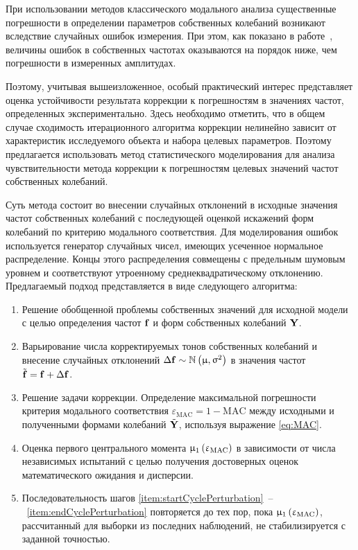 При использовании методов классического модального анализа существенные погрешности в определении параметров собственных колебаний возникают вследствие случайных ошибок измерения. При этом, как показано в работе~\cite{lib:ema:Berns:book}, величины ошибок в собственных частотах оказываются на порядок ниже, чем погрешности в измеренных амплитудах. 

Поэтому, учитывая вышеизложенное, особый практический интерес представляет оценка устойчивости результата коррекции к погрешностям в значениях частот, определенных экспериментально. Здесь необходимо отметить, что в общем случае сходимость итерационного алгоритма коррекции нелинейно зависит от характеристик исследуемого объекта и набора целевых параметров. Поэтому предлагается использовать метод статистического моделирования для анализа чувствительности метода коррекции к погрешностям целевых значений частот собственных колебаний.

Суть метода состоит во внесении случайных отклонений в исходные значения частот собственных колебаний с последующей оценкой искажений форм колебаний по критерию модального соответствия. Для моделирования ошибок используется генератор случайных чисел, имеющих усеченное нормальное распределение. Концы этого распределения совмещены с предельным шумовым уровнем и соответствуют утроенному среднеквадратическому отклонению. Предлагаемый подход представляется в виде следующего алгоритма:
\begin{enumerate}[noitemsep]
	\item Решение обобщенной проблемы собственных значений для исходной модели с целью определения частот $ \mathbf{f} $ и форм собственных колебаний $ \mathbf{Y} $.
	\item Варьирование числа корректируемых тонов собственных колебаний и внесение случайных отклонений $ \Delta \mathbf{f} \sim \mathbb{N} \left( \upmu, \upsigma^2 \right) $ в значения частот $ \tilde{\mathbf{f}} = \mathbf{f} + \Delta \mathbf{f} $. \label{item:startCyclePerturbation}
	\item Решение задачи коррекции. Определение максимальной погрешности критерия модального соответствия $\varepsilon_{\mathrm{MAC}} = 1 - \mathrm{MAC}$ между исходными и полученными формами колебаний $ \tilde{\mathbf{Y}}$, используя выражение \eqref{eq:MAC}.
	\item Оценка первого центрального момента $ \upmu_1\left( \upvarepsilon_{\mathrm{MAC}} \right) $ в зависимости от числа независимых испытаний с целью получения достоверных оценок математического ожидания и дисперсии. \label{item:endCyclePerturbation}
	\item Последовательность шагов \ref{item:startCyclePerturbation}~--~\ref{item:endCyclePerturbation} повторяется до тех пор, пока $ \upmu_1\left( \upvarepsilon_{\mathrm{MAC}} \right) $, рассчитанный для выборки из последних наблюдений, не стабилизируется с заданной точностью.
\end{enumerate}

